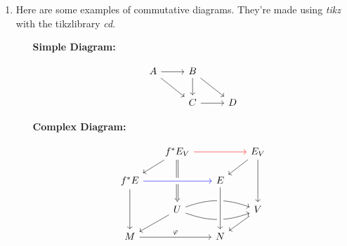 \begin{enumerate}
\begin{enumerate}[label = --\alph*--$>$]
      \end{enumerate}

    \item
      Here are some examples of commutative diagrams. They're made using \textit{tikz} with the tikzlibrary \textit{cd}. 

      \begin{enumerate}
        \item[\textbf{Simple Diagram:}]

          \begin{equation*}
            \begin{tikzcd}
              A \arrow[r] \arrow[rd] & B \arrow[d] \arrow[rd] \\
                          & C \arrow[r] & D
            \end{tikzcd}
          \end{equation*}

        \item[\textbf{Complex Diagram:}]

          \begin{equation*}
            \begin{tikzcd}[row sep=scriptsize, column sep=scriptsize]
              & f^* E_V \arrow[dl] \arrow[rr, red] \arrow[dd, Rightarrow] & & E_V \arrow[dl] \arrow[dd] \\
              f^* E \arrow[rr, crossing over, blue] \arrow[dd] & & E \\
              & U \arrow[dl] \arrow[rr, bend left=20] \arrow[rr, bend right=20] & & V \arrow[dl] \\
              M \arrow[rr, "\varphi"] & & N \arrow[from=uu, crossing over]\\
            \end{tikzcd}
          \end{equation*}

      \end{enumerate}

  \end{enumerate}

